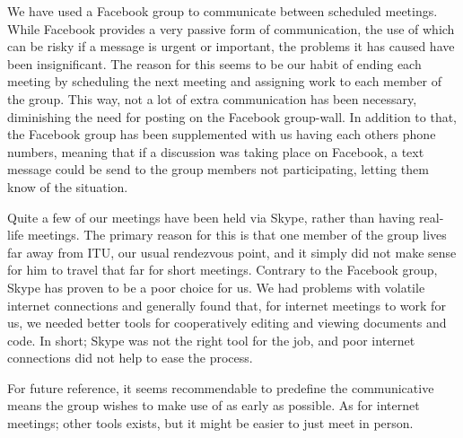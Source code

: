We have used a Facebook group to communicate between scheduled meetings. While Facebook provides a very passive form of communication, the use of which can be risky if a message is urgent or important, the problems it has caused 
have been insignificant. The reason for this seems to be our habit of ending each meeting by scheduling the next meeting and assigning work to each member of the group. This way, not a lot of extra communication has been necessary, diminishing the need for posting on the Facebook group-wall. In addition to that, the Facebook group has been supplemented with us having each others phone numbers, meaning that if a discussion was taking place on Facebook, a text message could be send to the group members not participating, letting them know of the situation.

Quite a few of our meetings have been held via Skype, rather than having real-life meetings. The primary reason for this is that one member of the group lives far away from ITU, our usual rendezvous point, and it simply did not make sense for him to travel that far for short meetings.
Contrary to the Facebook group, Skype has proven to be a poor choice for us. We had problems with volatile internet connections and generally found that, for internet meetings to work for us, we needed better tools for cooperatively editing and viewing documents and code. In short; Skype was not the right tool for the job, and poor internet connections did not help to ease the process.

For future reference, it seems recommendable to predefine the communicative means the group wishes to make use of as early as possible. As for internet meetings; other tools exists, but it might be easier to just meet in person.